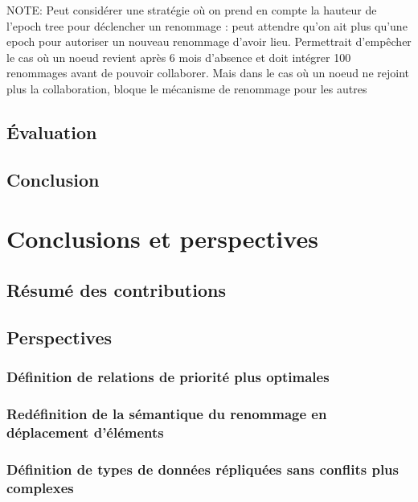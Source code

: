 \documentclass[12pt]{thesul}
\begin{document}
NOTE: Peut considérer une stratégie où on prend en compte la hauteur de l'epoch tree pour déclencher un renommage : peut attendre qu'on ait plus qu'une epoch pour autoriser un nouveau renommage d'avoir lieu.
Permettrait d'empêcher le cas où un noeud revient après 6 mois d'absence et doit intégrer 100 renommages avant de pouvoir collaborer.
Mais dans le cas où un noeud ne rejoint plus la collaboration, bloque le mécanisme de renommage pour les autres

\section{Évaluation}
\section{Conclusion}
% 

\NumberThisInToc
\chapter{Conclusions et perspectives}
\minitoc
\section{Résumé des contributions}
\section{Perspectives}
\subsection{Définition de relations de priorité plus optimales}
\subsection{Redéfinition de la sémantique du renommage en déplacement d'éléments}
\subsection{Définition de types de données répliquées sans conflits plus complexes}
% 

% 

%
\end{document}
